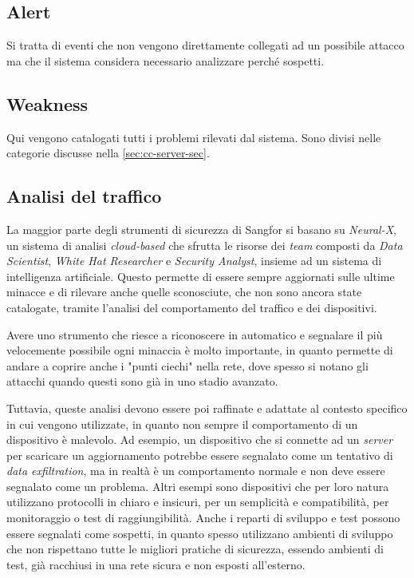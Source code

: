 \subsection{Alert}

Si tratta di eventi che non vengono direttamente collegati ad un possibile attacco ma che il sistema considera necessario analizzare perché sospetti.

\subsection{Weakness}

Qui vengono catalogati tutti i problemi rilevati dal sistema. Sono divisi nelle categorie discusse nella \autoref{sec:cc-server-sec}.

\subsection{Analisi del traffico}

La maggior parte degli strumenti di sicurezza di Sangfor si basano su \emph{Neural-X}\cite{site:sangfor-neural-x}, un sistema di analisi \emph{cloud-based} che sfrutta le risorse dei \emph{team} composti da \emph{Data Scientist}, \emph{White Hat Researcher} e \emph{Security Analyst}, insieme ad un sistema di intelligenza artificiale. Questo permette di essere sempre aggiornati sulle ultime minacce e di rilevare anche quelle sconosciute, che non sono ancora state catalogate, tramite l'analisi del comportamento del traffico e dei dispositivi.

Avere uno strumento che riesce a riconoscere in automatico e segnalare il più velocemente possibile ogni minaccia è molto importante, in quanto permette di andare a coprire anche i "punti ciechi" nella rete, dove spesso si notano gli attacchi quando questi sono già in uno stadio avanzato.

Tuttavia, queste analisi devono essere poi raffinate e adattate al contesto specifico in cui vengono utilizzate, in quanto non sempre il comportamento di un dispositivo è malevolo. Ad esempio, un dispositivo che si connette ad un \emph{server} per scaricare un aggiornamento potrebbe essere segnalato come un tentativo di \emph{data exfiltration}, ma in realtà è un comportamento normale e non deve essere segnalato come un problema. Altri esempi sono dispositivi che per loro natura utilizzano protocolli in chiaro e insicuri, per un semplicità e compatibilità, per monitoraggio o test di raggiungibilità. Anche i reparti di sviluppo e test possono essere segnalati come sospetti, in quanto spesso utilizzano ambienti di sviluppo che non rispettano tutte le migliori pratiche di sicurezza, essendo ambienti di test, già racchiusi in una rete sicura e non esposti all'esterno.

